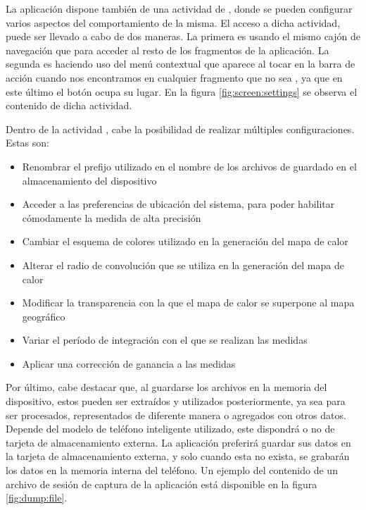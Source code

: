     La aplicación dispone también de una actividad de , donde se pueden configurar varios aspectos del comportamiento de la misma. El acceso a dicha actividad, puede ser llevado a cabo de dos maneras. La primera es usando el mismo cajón de navegación que para acceder al resto de los fragmentos de la aplicación. La segunda es haciendo uso del menú contextual que aparece al tocar en la barra de acción cuando nos encontramos en cualquier fragmento que no sea , ya que en este último el botón  ocupa su lugar. En la figura \ref{fig:screen:settings} se observa el contenido de dicha actividad.
    
    Dentro de la actividad , cabe la posibilidad de realizar múltiples configuraciones. Estas son:
    
    \begin{itemize}
    \item Renombrar el prefijo utilizado en el nombre de los archivos de guardado en el almacenamiento del dispositivo
    \item Acceder a las preferencias de ubicación del sistema, para poder habilitar cómodamente la medida de alta precisión
    \item Cambiar el esquema de colores utilizado en la generación del mapa de calor
    \item Alterar el radio de convolución que se utiliza en la generación del mapa de calor
    \item Modificar la transparencia con la que el mapa de calor se superpone al mapa geográfico
    \item Variar el período de integración con el que se realizan las medidas
    \item Aplicar una corrección de ganancia a las medidas
    \end{itemize}
    
    Por último, cabe destacar que, al guardarse los archivos en la memoria del dispositivo, estos pueden ser extraídos y utilizados posteriormente, ya sea para ser procesados, representados de diferente manera o agregados con otros datos. Depende del modelo de teléfono inteligente utilizado, este dispondrá o no de tarjeta de almacenamiento externa. La aplicación preferirá guardar sus datos en la tarjeta de almacenamiento externa, y solo cuando esta no exista, se grabarán los datos en la memoria interna del teléfono. Un ejemplo del contenido de un archivo de sesión de captura de la aplicación está disponible en la figura \ref{fig:dump:file}.
    
